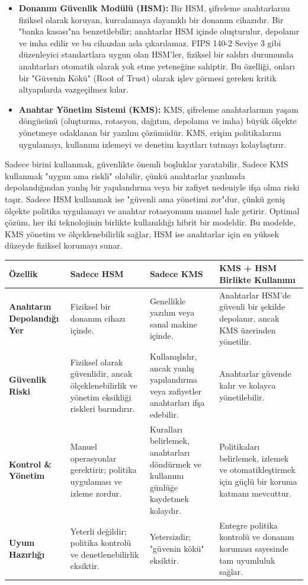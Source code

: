 \begin{itemize}
    \item \textbf{Donanım Güvenlik Modülü (HSM):} Bir HSM, şifreleme anahtarlarını fiziksel olarak koruyan, kurcalamaya dayanıklı bir donanım cihazıdır. Bir "banka kasası"na benzetilebilir; anahtarlar HSM içinde oluşturulur, depolanır ve imha edilir ve bu cihazdan asla çıkarılamaz. FIPS 140-2 Seviye 3 gibi düzenleyici standartlara uygun olan HSM'ler, fiziksel bir saldırı durumunda anahtarları otomatik olarak yok etme yeteneğine sahiptir. Bu özelliği, onları bir "Güvenin Kökü" (Root of Trust) olarak işlev görmesi gereken kritik altyapılarda vazgeçilmez kılar.
    \item \textbf{Anahtar Yönetim Sistemi (KMS):} KMS, şifreleme anahtarlarının yaşam döngüsünü (oluşturma, rotasyon, dağıtım, depolama ve imha) büyük ölçekte yönetmeye odaklanan bir yazılım çözümüdür. KMS, erişim politikalarını uygulamayı, kullanımı izlemeyi ve denetim kayıtları tutmayı kolaylaştırır.
\end{itemize}

Sadece birini kullanmak, güvenlikte önemli boşluklar yaratabilir. Sadece KMS kullanmak "uygun ama riskli" olabilir, çünkü anahtarlar yazılımda depolandığından yanlış bir yapılandırma veya bir zafiyet nedeniyle ifşa olma riski taşır. Sadece HSM kullanmak ise "güvenli ama yönetimi zor"dur, çünkü geniş ölçekte politika uygulamayı ve anahtar rotasyonunu manuel hale getirir. Optimal çözüm, her iki teknolojinin birlikte kullanıldığı hibrit bir modeldir. Bu modelde, KMS yönetim ve ölçeklenebilirlik sağlar, HSM ise anahtarlar için en yüksek düzeyde fiziksel korumayı sunar.

\begin{adjustbox}{max width=\textwidth}
\begin{tabularx}{\textwidth}{|l|X|X|X|}
\hline
\textbf{Özellik} & \textbf{Sadece HSM} & \textbf{Sadece KMS} & \textbf{KMS + HSM Birlikte Kullanımı} \\
\hline
\textbf{Anahtarın Depolandığı Yer} & Fiziksel bir donanım cihazı içinde. & Genellikle yazılım veya sanal makine içinde. & Anahtarlar HSM'de güvenli bir şekilde depolanır, ancak KMS üzerinden yönetilir. \\
\hline
\textbf{Güvenlik Riski} & Fiziksel olarak güvenlidir, ancak ölçeklenebilirlik ve yönetim eksikliği riskleri barındırır. & Kullanışlıdır, ancak yanlış yapılandırma veya zafiyetler anahtarları ifşa edebilir. & Anahtarlar güvende kalır ve kolayca yönetilebilir. \\
\hline
\textbf{Kontrol \& Yönetim} & Manuel operasyonlar gerektirir; politika uygulaması ve izleme zordur. & Kuralları belirlemek, anahtarları döndürmek ve kullanımı günlüğe kaydetmek kolaydır. & Politikaları belirlemek, izlemek ve otomatikleştirmek için güçlü bir koruma katmanı mevcuttur. \\
\hline
\textbf{Uyum Hazırlığı} & Yeterli değildir; politika kontrolü ve denetlenebilirlik eksiktir. & Yetersizdir; "güvenin kökü" eksiktir. & Entegre politika kontrolü ve donanım koruması sayesinde tam uyumluluk sağlar. \\
\hline
\end{tabularx}
\end{adjustbox}

